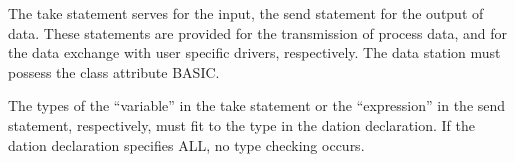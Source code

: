 The take statement serves for the input, the send statement for the
output of data. These statements are provided for the transmission of
process data, and for the data exchange with user specific drivers,
respectively. The data station must possess the class attribute BASIC.






The types of the ``variable'' in the take statement or the
``expression'' in the send statement, respectively, must fit to 
the type in the dation declaration. If the dation declaration 
specifies ALL, no type checking occurs.

